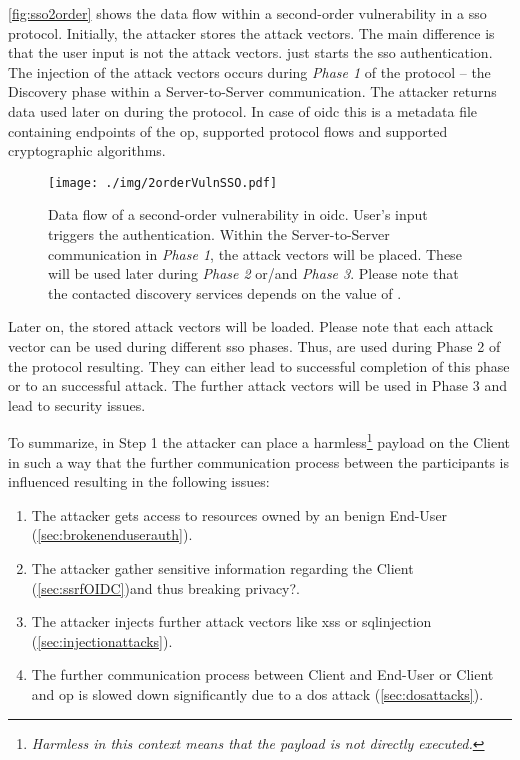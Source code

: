 \documentclass[conference,compsoc]{IEEEtran}
\begin{document}
\autoref{fig:sso2order} shows the data flow within a second-order vulnerability in a \gls{sso} protocol.
Initially, the attacker stores the attack vectors. The main difference is that the user input  is not the attack vectors.  just starts the \gls{sso} authentication.
The injection of the attack vectors occurs during \emph{Phase 1} of the protocol -- the Discovery phase within a Server-to-Server communication. The attacker returns data used later on during the protocol. 
In case of \gls{oidc} this is a metadata file containing endpoints of the \gls{op}, supported protocol flows and supported cryptographic algorithms.

\begin{figure}[!ht]
	\centering
	\texttt{[image: ./img/2orderVulnSSO.pdf]}
\caption{Data flow of a second-order vulnerability in \gls{oidc}. User's input  triggers the authentication. Within the Server-to-Server communication in \emph{Phase 1}, the attack vectors will be placed. These will be used later during \emph{Phase 2} or/and \emph{Phase 3}. Please note that the contacted discovery services depends on the value of .}
	\label{fig:sso2order}
\end{figure}


Later on, the stored attack vectors  will be loaded.
Please note that each attack vector can be used during different \gls{sso} phases. Thus,  are used during Phase 2 of the protocol resulting. 
They can either lead to successful completion of this phase or to an successful attack.
The further attack vectors  will be used in Phase 3 and lead to security issues.


To summarize, in Step 1 the attacker can place a harmless\footnote{\emph{Harmless in this context means that the payload is not directly executed.}} payload on the Client in such a way that the further communication process between the participants is influenced resulting in the following issues:
\begin{enumerate}
 \item The attacker gets access to resources owned by an benign End-User (\autoref{sec:brokenenduserauth}).
 \item The attacker gather sensitive information regarding the Client (\autoref{sec:ssrfOIDC})and thus breaking privacy?.
 \item The attacker injects further attack vectors like \gls{xss} or \gls{sqlinjection} (\autoref{sec:injectionattacks}).
 \item The further communication process between Client and End-User or Client and \gls{op} is slowed down significantly due to a \gls{dos} attack (\autoref{sec:dosattacks}).
\end{enumerate}
\end{document}
